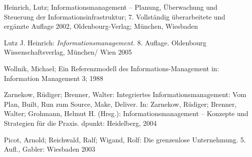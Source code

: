 \documentclass[a4paper]{article}
\begin{document}
\bigskip

{\sffamily\color{black}
Heinrich, Lutz; Informationsmanagement – Planung, Überwachung und Steuerung der Informationsinfrastruktur; 7.
Vollständig überarbeitete und ergänzte Auflage 2002, Oldenbourg-Verlag; München, Wiesbaden }


\bigskip

{\sffamily\color{black}
\textcolor[rgb]{0.14509805,0.14509805,0.14509805}{Lutz J. Heinrich:
}\textit{\textcolor[rgb]{0.14509805,0.14509805,0.14509805}{Informationsmanagement.
}}\textcolor[rgb]{0.14509805,0.14509805,0.14509805}{8. Auflage. Oldenbourg Wissenschaftsverlag, München/ Wien 2005} }


\bigskip

{\sffamily\color{black}
Wollnik, Michael; Ein Referenzmodell des Informations-Management in: Information Management 3; 1988 }

{\sffamily\color{black}
Zarnekow, Rüdiger; Brenner, Walter: Integriertes Informationsmanagement: Vom Plan, Built, Run zum Source, Make, Deliver.
In: Zarnekow, Rüdiger; Brenner, Walter; Grohmann, Helmut H. (Hrsg.): Informationsmanagement – Konzepte und Strategien
für die Praxis. dpunkt: Heidelberg, 2004}


\bigskip

{\sffamily\color{black}
Picot, Arnold; Reichwald, Ralf; Wigand, Rolf: Die grenzenlose Unternehmung. 5. Aufl., Gabler: Wiesbaden 2003}


\bigskip
\end{document}
